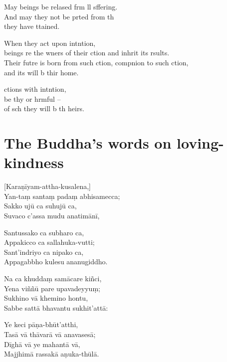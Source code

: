 May  beings be relased frm ll sffering.\\
And may they not be prted from th\\
 they have ttained.

When they act upon intntion,\\
 beings re the wners of their ction and inhrit its rsults.\\
Their futre is born from such ction, compnion to such ction,\\
and its  will b thir home.

 ctions with intntion,\\
be thy  or hrmful --\\
of sch  they will b th heirs.

\clearpage

\chapter[Loving-kindness]{The Buddha's words on loving-kindness}                                       %

\begin{leader}
\end{leader}

[Karaṇīyam-attha-kusalena,]\\
Yan-taṃ santaṃ padaṃ abhisamecca;\\
Sakko ujū ca suhujū ca,\\
Suvaco c'assa mudu anatimānī,

Santussako ca subharo ca,\\
Appakicco ca sallahuka-vutti;\\
Sant'indriyo ca nipako ca,\\
Appagabbho kulesu ananugiddho.

Na ca khuddaṃ samācare kiñci,\\
Yena viññū pare upavadeyyuṃ;\\
Sukhino vā khemino hontu,\\
Sabbe sattā bhavantu sukhit'attā:

Ye keci pāṇa-bhūt'atthi,\\
Tasā vā thāvarā vā anavasesā;\\
Dīghā vā ye mahantā vā,\\
Majjhimā rassakā aṇuka-thūlā.

